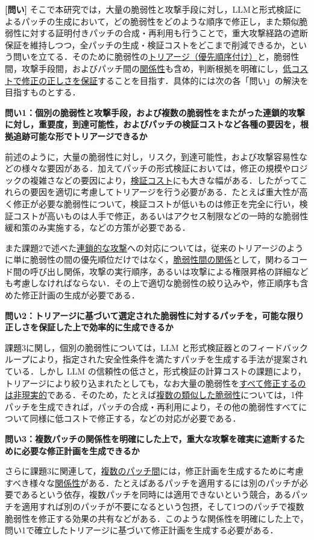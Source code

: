 \documentclass[11pt,a4j,dvipdfmx]{jarticle} 					%
\newcommand{\研究課題名}{大量の脆弱性・攻撃手段・パッチの依存関係を考慮した証明付き修正計画の自動生成}
\newcommand{\研究機関名}{電気通信大学}
\newcommand{\研究代表者氏名}{田原 康之}
\newcommand{\研究期間の最終元号年度}{12}  %
\begin{document}
\textbf{[問い]} そこで本研究では，大量の脆弱性と攻撃手段に対し，LLMと形式検証によるパッチの生成において，どの脆弱性をどのような順序で修正し，また類似脆弱性に対する証明付きパッチの合成・再利用も行うことで，重大攻撃経路の遮断保証を維持しつつ，全パッチの生成・検証コストをどこまで削減できるか，という問いを立てる．そのために脆弱性の\ul{トリアージ（優先順序付け）}と，脆弱性間，攻撃手段間，およびパッチ間の\ul{関係性}も含め，判断根拠を明確にし，\ul{低コストで修正の正しさを保証}することを目指す．具体的には次の各「問い」の解決を目指すものとする．

\textbf{問い1：個別の脆弱性と攻撃手段，および複数の脆弱性をまたがった連鎖的攻撃に対し，重要度，到達可能性，およびパッチの検証コストなど各種の要因を，根拠追跡可能な形でトリアージできるか}

前述のように，大量の脆弱性に対し，リスク，到達可能性，および攻撃容易性などの様々な要因がある．加えてパッチの形式検証においては，修正の規模やロジックの複雑さなどの要因により，\ul{検証コスト}にも大きな幅がある．したがってこれらの要因を適切に考慮してトリアージを行う必要がある．たとえば重大性が高く修正が必要な脆弱性について，検証コストが低いものは修正を完全に行い，検証コストが高いものは人手で修正，あるいはアクセス制限などの一時的な脆弱性緩和策のみ実施する，などの方策が必要である．

また課題2で述べた\ul{連鎖的な攻撃}への対応については，従来のトリアージのように単に脆弱性の間の優先順位だけではなく，\ul{脆弱性間の関係}として，関わるコード間の呼び出し関係，攻撃の実行順序，あるいは攻撃による権限昇格の詳細なども考慮しなければならない．その上で適切な脆弱性の絞り込みや，修正順序も含めた修正計画の生成が必要である．

\textbf{問い2：トリアージに基づいて選定された脆弱性に対するパッチを，可能な限り正しさを保証した上で効率的に生成できるか}

課題3に関し，個別の脆弱性については，LLM と形式検証器とのフィードバックループにより，指定された安全性条件を満たすパッチを生成する手法が提案されている．しかし LLM の信頼性の低さと，形式検証の計算コストの課題により，トリアージにより絞り込まれたとしても，なお大量の脆弱性を\ul{すべて修正するのは非現実的}である．そのため，たとえば\ul{複数の類似した脆弱性}については，1件パッチを生成できれば，パッチの合成・再利用により，その他の脆弱性すべてについて同様に低コストで修正する，などの対応が必要である．

\textbf{問い3：複数パッチの関係性を明確にした上で，重大な攻撃を確実に遮断するために必要な修正計画を生成できるか}

さらに課題3に関連して，\ul{複数のパッチ間}には，修正計画を生成するために考慮すべき様々な\ul{関係性}がある．たとえばあるパッチを適用するには別のパッチが必要であるという依存，複数パッチを同時には適用できないという競合，あるパッチを適用すれば別のパッチが不要になるという包摂，そして1つのパッチで複数脆弱性を修正する効果の共有などがある．このような関係性を明確にした上で，問い1で確立したトリアージに基づいて修正計画を生成する必要がある．
	
\end{document}
